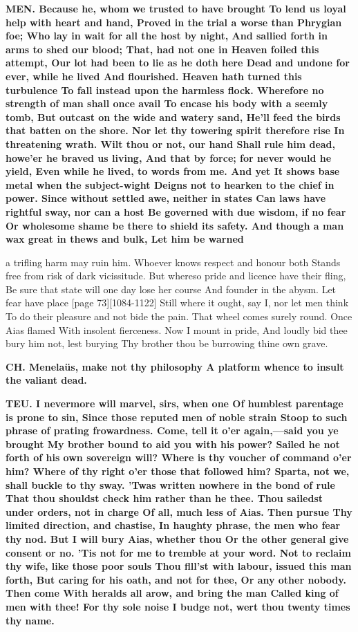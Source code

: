 \documentclass[11pt,letter]{book}
\begin{document}
\par \textbf{MEN. Because he, whom we trusted to have brought To lend us loyal help with heart and hand, Proved in the trial a worse than Phrygian foe; Who lay in wait for all the host by night, And sallied forth in arms to shed our blood; That, had not one in Heaven foiled this attempt, Our lot had been to lie as he doth here Dead and undone for ever, while he lived And flourished. Heaven hath turned this turbulence To fall instead upon the harmless flock. Wherefore no strength of man shall once avail To encase his body with a seemly tomb, But outcast on the wide and watery sand, He’ll feed the birds that batten on the shore. Nor let thy towering spirit therefore rise In threatening wrath. Wilt thou or not, our hand Shall rule him dead, howe’er he braved us living, And that by force; for never would he yield, Even while he lived, to words from me. And yet It shows base metal when the subject-wight Deigns not to hearken to the chief in power. Since without settled awe, neither in states Can laws have rightful sway, nor can a host Be governed with due wisdom, if no fear Or wholesome shame be there to shield its safety. And though a man wax great in thews and bulk, Let him be warned}
\par   a trifling harm may ruin him. Whoever knows respect and honour both Stands free from risk of dark vicissitude. But whereso pride and licence have their fling, Be sure that state will one day lose her course And founder in the abysm. Let fear have place [page 73][1084-1122] Still where it ought, say I, nor let men think To do their pleasure and not bide the pain. That wheel comes surely round. Once Aias flamed With insolent fierceness. Now I mount in pride, And loudly bid thee bury him not, lest burying Thy brother thou be burrowing thine own grave.

\par \textbf{CH. Menelaüs, make not thy philosophy A platform whence to insult the valiant dead.}
\par 

\par \textbf{TEU. I nevermore will marvel, sirs, when one Of humblest parentage is prone to sin, Since those reputed men of noble strain Stoop to such phrase of prating frowardness. Come, tell it o’er again,—said you ye brought My brother bound to aid you with his power? Sailed he not forth of his own sovereign will? Where is thy voucher of command o’er him? Where of thy right o’er those that followed him? Sparta, not we, shall buckle to thy sway. ’Twas written nowhere in the bond of rule That thou shouldst check him rather than he thee. Thou sailedst under orders, not in charge Of all, much less of Aias. Then pursue Thy limited direction, and chastise, In haughty phrase, the men who fear thy nod. But I will bury Aias, whether thou Or the other general give consent or no. ’Tis not for me to tremble at your word. Not to reclaim thy wife, like those poor souls Thou flll’st with labour, issued this man forth, But caring for his oath, and not for thee, Or any other nobody. Then come With heralds all arow, and bring the man Called king of men with thee! For thy sole noise I budge not, wert thou twenty times thy name.}
\par 
\end{document}
